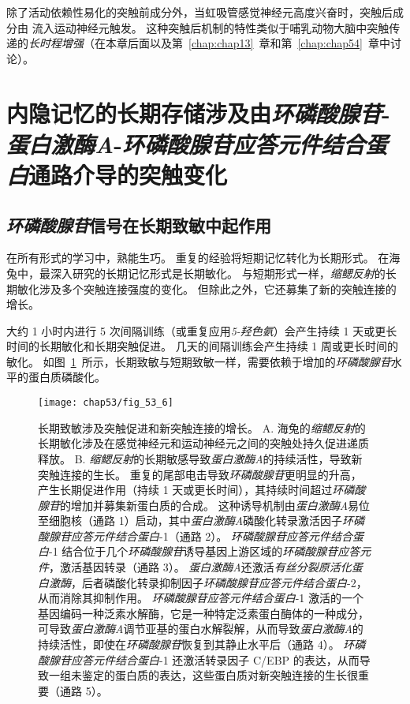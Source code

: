 除了活动依赖性易化的突触前成分外，当虹吸管感觉神经元高度兴奋时，突触后成分由  流入运动神经元触发。
这种突触后机制的特性类似于哺乳动物大脑中突触传递的\textit{长时程增强}（在本章后面以及第~\ref{chap:chap13}~章和第~\ref{chap:chap54}~章中讨论）。



\section{内隐记忆的长期存储涉及由\textit{环磷酸腺苷}-\textit{蛋白激酶A}-\textit{环磷酸腺苷应答元件结合蛋白}通路介导的突触变化}

\subsection{\textit{环磷酸腺苷}信号在长期致敏中起作用}

在所有形式的学习中，熟能生巧。
重复的经验将短期记忆转化为长期形式。
在海兔中，最深入研究的长期记忆形式是长期敏化。
与短期形式一样，\textit{缩鳃反射}的长期敏化涉及多个突触连接强度的变化。
但除此之外，它还募集了新的突触连接的增长。


大约 1 小时内进行 5 次间隔训练（或重复应用\textit{5-羟色氨}）会产生持续 1 天或更长时间的长期敏化和长期突触促进。
几天的间隔训练会产生持续 1 周或更长时间的敏化。
如图~\ref{fig:53_6}~所示，长期致敏与短期致敏一样，需要依赖于增加的\textit{环磷酸腺苷}水平的蛋白质磷酸化。


\begin{figure}[htbp]
	\centering
	\texttt{[image: chap53/fig\_53\_6]}
	\caption{长期致敏涉及突触促进和新突触连接的增长。
		A. 海兔的\textit{缩鳃反射}的长期敏化涉及在感觉神经元和运动神经元之间的突触处持久促进递质释放。
		B. \textit{缩鳃反射}的长期敏感导致\textit{蛋白激酶A}的持续活性，导致新突触连接的生长。
		重复的尾部电击导致\textit{环磷酸腺苷}更明显的升高，产生长期促进作用（持续 1 天或更长时间），其持续时间超过\textit{环磷酸腺苷}的增加并募集新蛋白质的合成。
		这种诱导机制由\textit{蛋白激酶A}易位至细胞核（通路 1）启动，其中\textit{蛋白激酶A}磷酸化转录激活因子\textit{环磷酸腺苷应答元件结合蛋白}-1（通路 2）。
		\textit{环磷酸腺苷应答元件结合蛋白}-1 结合位于几个\textit{环磷酸腺苷}诱导基因上游区域的\textit{环磷酸腺苷应答元件}，激活基因转录（通路 3）。
		\textit{蛋白激酶A}还激活\textit{有丝分裂原活化蛋白激酶}，后者磷酸化转录抑制因子\textit{环磷酸腺苷应答元件结合蛋白}-2，从而消除其抑制作用。
		\textit{环磷酸腺苷应答元件结合蛋白}-1 激活的一个基因编码一种泛素水解酶，它是一种特定泛素蛋白酶体的一种成分，可导致\textit{蛋白激酶A}调节亚基的蛋白水解裂解，从而导致\textit{蛋白激酶A}的持续活性，即使在\textit{环磷酸腺苷}恢复到其静止水平后（通路 4）。
		\textit{环磷酸腺苷应答元件结合蛋白}-1 还激活转录因子 C/EBP 的表达，从而导致一组未鉴定的蛋白质的表达，这些蛋白质对新突触连接的生长很重要（通路 5）。}
	\label{fig:53_6}
\end{figure}


